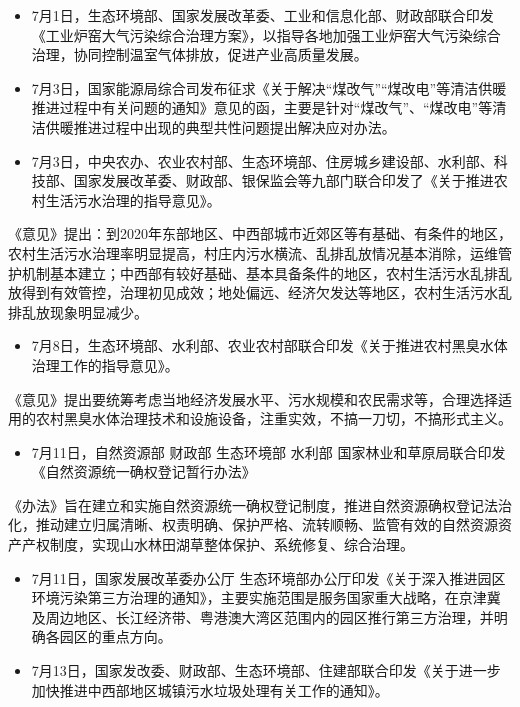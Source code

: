 \documentclass[]{book}
\providecommand{\tightlist}{%
  \setlength{\itemsep}{0pt}\setlength{\parskip}{0pt}}
\begin{document}
\begin{itemize}
\item
  7月1日，生态环境部、国家发展改革委、工业和信息化部、财政部联合印发《工业炉窑大气污染综合治理方案》，以指导各地加强工业炉窑大气污染综合治理，协同控制温室气体排放，促进产业高质量发展。
\item
  7月3日，国家能源局综合司发布征求《关于解决``煤改气''``煤改电''等清洁供暖推进过程中有关问题的通知》意见的函，主要是针对``煤改气''、``煤改电''等清洁供暖推进过程中出现的典型共性问题提出解决应对办法。
\item
  7月3日，中央农办、农业农村部、生态环境部、住房城乡建设部、水利部、科技部、国家发展改革委、财政部、银保监会等九部门联合印发了《关于推进农村生活污水治理的指导意见》。
\end{itemize}

《意见》提出：到2020年东部地区、中西部城市近郊区等有基础、有条件的地区，农村生活污水治理率明显提高，村庄内污水横流、乱排乱放情况基本消除，运维管护机制基本建立；中西部有较好基础、基本具备条件的地区，农村生活污水乱排乱放得到有效管控，治理初见成效；地处偏远、经济欠发达等地区，农村生活污水乱排乱放现象明显减少。

\begin{itemize}
\tightlist
\item
  7月8日，生态环境部、水利部、农业农村部联合印发《关于推进农村黑臭水体治理工作的指导意见》。
\end{itemize}

《意见》提出要统筹考虑当地经济发展水平、污水规模和农民需求等，合理选择适用的农村黑臭水体治理技术和设施设备，注重实效，不搞一刀切，不搞形式主义。

\begin{itemize}
\tightlist
\item
  7月11日，自然资源部 财政部 生态环境部 水利部 国家林业和草原局联合印发《自然资源统一确权登记暂行办法》
\end{itemize}

《办法》旨在建立和实施自然资源统一确权登记制度，推进自然资源确权登记法治化，推动建立归属清晰、权责明确、保护严格、流转顺畅、监管有效的自然资源资产产权制度，实现山水林田湖草整体保护、系统修复、综合治理。

\begin{itemize}
\item
  7月11日，国家发展改革委办公厅 生态环境部办公厅印发《关于深入推进园区环境污染第三方治理的通知》，主要实施范围是服务国家重大战略，在京津冀及周边地区、长江经济带、粤港澳大湾区范围内的园区推行第三方治理，并明确各园区的重点方向。
\item
  7月13日，国家发改委、财政部、生态环境部、住建部联合印发《关于进一步加快推进中西部地区城镇污水垃圾处理有关工作的通知》。
\end{itemize}
\end{document}
